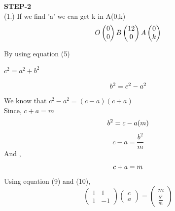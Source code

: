 \documentclass[10pt,a4paper]{report}
\begin{document}
\begin{multicols}{2}
\textbf{STEP-2}\vspace{2mm}\\
(1.) If we find 'a' we can get k in A(0,k) \\\vspace{2mm}
\begin{equation}
    O\begin{pmatrix}
0\\
0
\end{pmatrix} 
    B\begin{pmatrix}
12\\
0
\end{pmatrix} 
    A\begin{pmatrix}
0\\
k
 \end{pmatrix}  \vspace{3mm}
\end{equation}
  
By using equation (5)
\begin{center}
    $ c^2 =a^2 + b^2 $ \vspace{2mm}
\end{center}
\begin{equation}
    b^2 = c^2- a^2 \vspace{2mm}
\end{equation}
We know that $c^2- a^2 =  (c-a) (c+a)$\vspace{2mm}\\
Since, $ c+a=m$
\begin{equation}
  b^2 = c-a (m) \vspace{2mm}
\end{equation}
\begin{equation}
 c-a = \frac{b^2}{m}
\end{equation}
And ,
\begin{equation}
 c+a = m \vspace{2mm}
\end{equation}
Using equation (9) and (10),
\begin{equation}
  \begin{pmatrix}
1 & 1\\
1 &-1
\end{pmatrix} 
\begin{pmatrix}
c\\
a
\end{pmatrix} = \begin{pmatrix}
m\\
\frac{b^2}{m}
\end{pmatrix} 
\end{equation}\vspace{2mm}\\


\end{multicols}
\end{document}
